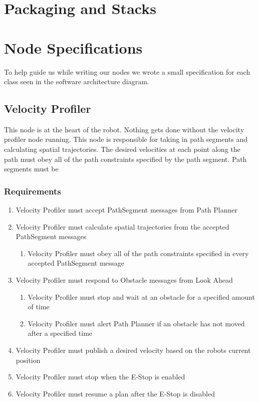 \section{Packaging and Stacks}

\section{Node Specifications}

To help guide us while writing our nodes we wrote a small
specification for each class seen in the software architecture diagram.

\subsection{Velocity Profiler}
This node is at the heart of the robot.  Nothing gets done without the
velocity profiler node running.  This node is responsible for taking
in path segments and calculating spatial trajectories.  The desired
velocities at each point along the path must obey all of the path
constraints specified by the path segment.  Path segments must be

\subsubsection{Requirements}
\begin{enumerate}
  \item Velocity Profiler must accept PathSegment messages from
    Path Planner
    \item Velocity Profiler must calculate spatial trajectories from
      the accepted PathSegment messages
      \begin{enumerate}
        \item Velocity Profiler must obey all of the path constraints
          specified in every accepted PathSegment message
         \end {enumerate}
\item Velocity Profiler must respond to Obstacle messages from Look
  Ahead
  \begin{enumerate}
    \item Velocity Profiler must stop and wait at an obstacle for a
      specified amount of time
      \item Velocity Profiler must alert Path Planner if an obstacle
        has not moved after a specified time
      \end{enumerate}
      \item Velocity Profiler must publish a desired velocity based on
        the robots current position
      \item Velocity Profiler must stop when the E-Stop is enabled
        \item Velocity Profiler must resume a plan after the E-Stop is
  disabled
  \end{enumerate}
      
